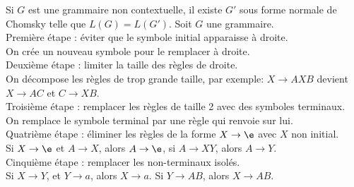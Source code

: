 \documentclass[french, 11pt]{article}
\begin{document}
\begin{prop}{}{}
    Si $G$ est une grammaire non contextuelle, il existe $G'$ sous forme normale de Chomsky telle que $L(G)=L(G')$.
    \tcblower
    Soit $G$ une grammaire.\\
    Première étape : éviter que le symbole initial apparaisse à droite.\\
    On crée un nouveau symbole pour le remplacer à droite.\\
    Deuxième étape : limiter la taille des règles de droite.\\
    On décompose les règles de trop grande taille, par exemple: $X\to AXB$ devient $X\to AC$ et $C\to XB$.\\
    Troisième étape : remplacer les règles de taille 2 avec des symboles terminaux.\\
    On remplace le symbole terminal par une règle qui renvoie sur lui.\\
    Quatrième étape : éliminer les règles de la forme $X \to \e$ avec $X$ non initial.\\
    Si $X\to\e$ et $A\to X$, alors $A\to\e$, si $A\to XY$, alors $A\to Y$.\\
    Cinquième étape : remplacer les non-terminaux isolés.\\
    Si $X\to Y$, et $Y\to a$, alors $X\to a$. Si $Y\to AB$, alors $X\to AB$.
\end{prop}
\end{document}
